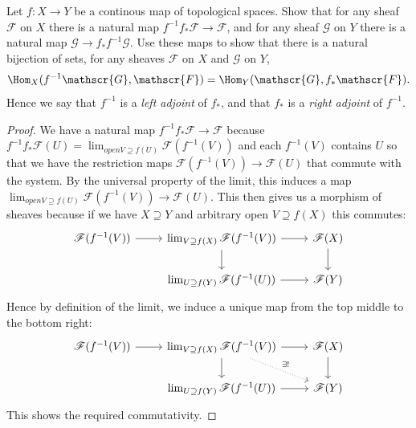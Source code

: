 \begin{exercise}%
	Let $f: X\to Y $ be a continous map of topological spaces. Show that for any sheaf $\mathscr{F} $ on $X $ there is a natural map $f^{-1}f_\ast \mathscr{F} \to \mathscr{F} $, and for any sheaf $\mathscr{G} $ on $Y $ there is a natural map $\mathscr{G} \to f_\ast f^{-1}\mathscr{G} $. Use these maps to show that there is a natural bijection of sets, for any sheaves $\mathscr{F} $ on $X $ and $\mathscr{G} $ on $Y $,
	\[
		\Hom_X(f^{-1}\mathscr{G},\mathscr{F}) = \Hom_Y(\mathscr{G},f_\ast \mathscr{F})
	.\]
	Hence we say that $f ^{-1} $ is a \textit{left adjoint} of $f_\ast $, and that $f_\ast $ is a \textit{right adjoint} of $f^{-1} $.
\end{exercise}
\begin{proof}
	We have a natural map $f^{-1}f_\ast \mathscr{F} \to \mathscr{F} $ because $f^{-1}f_\ast \mathscr{F}(U) = \lim_{open V \supseteq f(U)} \mathscr{F}(f^{-1}(V)) $ and each $f^{-1}(V) $ contains $U $ so that we have the restriction maps $\mathscr{F}(f^{-1}(V)) \to \mathscr{F}(U) $ that commute with the system.
	By the universal property of the limit, this induces a map $\lim_{open V \supseteq f(U)} \mathscr{F}(f^{-1}(V)) \to \mathscr{F}(U) $.
	This then gives us a morphism of sheaves because if we have $X \supseteq Y $ and arbitrary open $V \supseteq f(X) $ this commutes:
	\[
	\begin{tikzcd}
		\mathscr{F}(f^{-1}(V)) & \lim_{V \supseteq f(X)} \mathscr{F}(f^{-1}(V)) & \mathscr{F}(X)\\
				       & \lim_{U \supseteq f(Y)} \mathscr{F}(f^{-1}(U)) & \mathscr{F}(Y)
	\arrow[from=1-1,to=1-2]
	\arrow[from=1-2,to=1-3]
	\arrow[from=1-2,to=2-2]
	\arrow[from=2-2,to=2-3]
	\arrow[from=1-3,to=2-3]
	\end{tikzcd}
	\]
	Hence by definition of the limit, we induce a unique map from the top middle to the bottom right:
	\[
	\begin{tikzcd}
		\mathscr{F}(f^{-1}(V)) & \lim_{V \supseteq f(X)} \mathscr{F}(f^{-1}(V)) & \mathscr{F}(X)\\
				       & \lim_{U \supseteq f(Y)} \mathscr{F}(f^{-1}(U)) & \mathscr{F}(Y)
	\arrow[from=1-1,to=1-2]
	\arrow[from=1-2,to=1-3]
	\arrow[from=1-2,to=2-2]
	\arrow[from=2-2,to=2-3]
	\arrow[from=1-3,to=2-3]
	\arrow["\exists!",dotted,from=1-2,to=2-3]
	\end{tikzcd}
	\]
	This shows the required commutativity.


\end{proof}
